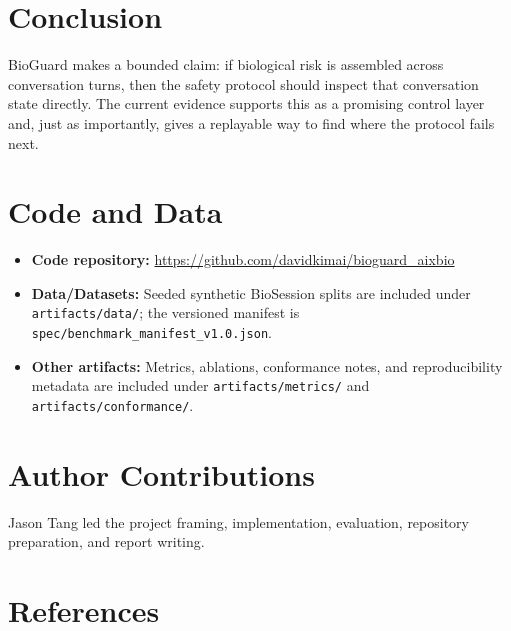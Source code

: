 \documentclass[11pt]{article}
\begin{document}
\section{Conclusion}

BioGuard makes a bounded claim: if biological risk is assembled across conversation turns, then the safety protocol should inspect that conversation state directly. The current evidence supports this as a promising control layer and, just as importantly, gives a replayable way to find where the protocol fails next.

\section*{Code and Data}

\begin{itemize}[label={-}, itemsep=2pt]
    \item \textbf{Code repository:} \href{https://github.com/davidkimai/bioguard_aixbio}{https://github.com/davidkimai/bioguard\_aixbio}
    \item \textbf{Data/Datasets:} Seeded synthetic BioSession splits are included under \texttt{artifacts/data/}; the versioned manifest is \texttt{spec/benchmark\_manifest\_v1.0.json}.
    \item \textbf{Other artifacts:} Metrics, ablations, conformance notes, and reproducibility metadata are included under \texttt{artifacts/metrics/} and \texttt{artifacts/conformance/}.
\end{itemize}

\section*{Author Contributions}

Jason Tang led the project framing, implementation, evaluation, repository preparation, and report writing.

\section*{References}
\end{document}
